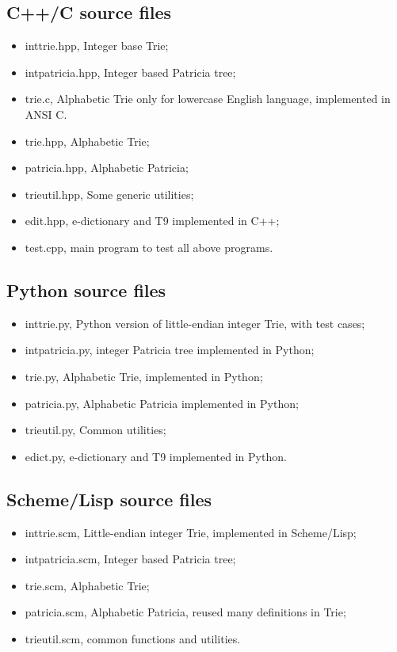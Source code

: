 \documentclass{article}
\begin{document}
\subsection{C++/C source files}

\begin{itemize}
\item inttrie.hpp, Integer base Trie;
\item intpatricia.hpp, Integer based Patricia tree;
\item trie.c, Alphabetic Trie only for lowercase English language,
implemented in ANSI C. 
\item trie.hpp, Alphabetic Trie;
\item patricia.hpp, Alphabetic Patricia;
\item trieutil.hpp, Some generic utilities;
\item edit.hpp, e-dictionary and T9 implemented in C++;
\item test.cpp, main program to test all above programs.
\end{itemize}

\subsection{Python source files}

\begin{itemize}
\item inttrie.py, Python version of little-endian integer Trie, with
test cases;
\item intpatricia.py, integer Patricia tree implemented in Python;
\item trie.py, Alphabetic Trie, implemented in Python;
\item patricia.py, Alphabetic Patricia implemented in Python;
\item trieutil.py, Common utilities;
\item edict.py, e-dictionary and T9 implemented in Python.
\end{itemize}

\subsection{Scheme/Lisp source files}

\begin{itemize}
\item inttrie.scm, Little-endian integer Trie, implemented in Scheme/Lisp;
\item intpatricia.scm, Integer based Patricia tree;
\item trie.scm, Alphabetic Trie;
\item patricia.scm, Alphabetic Patricia, reused many definitions in
Trie;
\item trieutil.scm, common functions and utilities.
\end{itemize}
\end{document}
